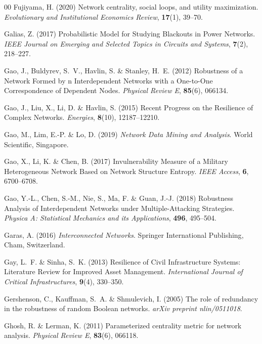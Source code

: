 \documentclass{comnet-mod}
\begin{document}
\begin{thebibliography}{00}
Fujiyama, H. (2020)  Network centrality, social loops, and utility
  maximization. {\em {Evolutionary and Institutional Economics Review}},
  \textbf{17}(1), 39--70.

Galias, Z. (2017)  {Probabilistic Model for Studying Blackouts in Power
  Networks}. {\em {IEEE Journal on Emerging and Selected Topics in Circuits and
  Systems}}, \textbf{7}(2), 218--227.

Gao, J., Buldyrev, S.~V., Havlin, S. {\&} Stanley, H.~E. (2012)  {Robustness of
  a Network Formed by n Interdependent Networks with a One-to-One
  Correspondence of Dependent Nodes}. {\em {Physical Review E}},
  \textbf{85}(6), 066134.

Gao, J., Liu, X., Li, D. {\&} Havlin, S. (2015)  {Recent Progress on the
  Resilience of Complex Networks}. {\em {Energies}}, \textbf{8}(10),
  12187--12210.

Gao, M., Lim, E.-P. {\&} Lo, D. (2019) {\em {Network Data Mining and
  Analysis}}.
{World Scientific}, Singapore.

Gao, X., Li, K. {\&} Chen, B. (2017)  {Invulnerability Measure of a Military
  Heterogeneous Network Based on Network Structure Entropy}. {\em {IEEE
  Access}}, \textbf{6}, 6700--6708.

Gao, Y.-L., Chen, S.-M., Nie, S., Ma, F. {\&} Guan, J.-J. (2018)  {Robustness
  Analysis of Interdependent Networks under Multiple-Attacking Strategies}.
  {\em {Physica A: Statistical Mechanics and its Applications}}, \textbf{496},
  495--504.

Garas, A. (2016) {\em {Interconnected Networks}}.
{Springer International Publishing}, {Cham, Switzerland}.

Gay, L.~F. {\&} Sinha, S.~K. (2013)  {Resilience of Civil Infrastructure
  Systems: {{Literature}} Review for Improved Asset Management}. {\em
  {International Journal of Critical Infrastructures}}, \textbf{9}(4),
  330--350.

Gershenson, C., Kauffman, S.~A. {\&} Shmulevich, I. (2005)  The role of
  redundancy in the robustness of random Boolean networks. {\em arXiv preprint
  nlin/0511018}.

Ghosh, R. {\&} Lerman, K. (2011)  Parameterized centrality metric for network
  analysis. {\em {Physical Review E}}, \textbf{83}(6), 066118.


\end{thebibliography}
\end{document}
